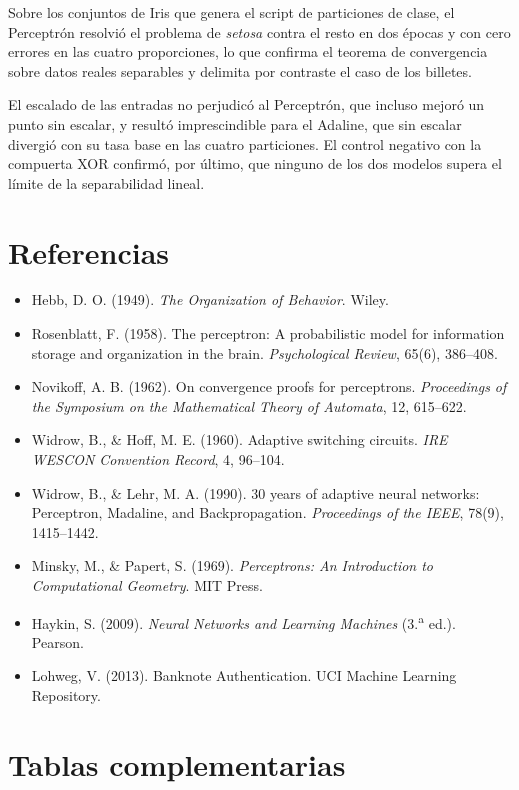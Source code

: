 \documentclass[11pt,letterpaper]{article}
\begin{document}
Sobre los conjuntos de Iris que genera el script de particiones de clase, el Perceptrón resolvió el problema de \textit{setosa} contra el resto en dos épocas y con cero errores en las cuatro proporciones, lo que confirma el teorema de convergencia sobre datos reales separables y delimita por contraste el caso de los billetes.

El escalado de las entradas no perjudicó al Perceptrón, que incluso mejoró un punto sin escalar, y resultó imprescindible para el Adaline, que sin escalar divergió con su tasa base en las cuatro particiones. El control negativo con la compuerta XOR confirmó, por último, que ninguno de los dos modelos supera el límite de la separabilidad lineal.

\section{Referencias}
\begin{itemize}
    \item Hebb, D. O. (1949). \textit{The Organization of Behavior}. Wiley.
    \item Rosenblatt, F. (1958). The perceptron: A probabilistic model for information storage and organization in the brain. \textit{Psychological Review}, 65(6), 386--408.
    \item Novikoff, A. B. (1962). On convergence proofs for perceptrons. \textit{Proceedings of the Symposium on the Mathematical Theory of Automata}, 12, 615--622.
    \item Widrow, B., \& Hoff, M. E. (1960). Adaptive switching circuits. \textit{IRE WESCON Convention Record}, 4, 96--104.
    \item Widrow, B., \& Lehr, M. A. (1990). 30 years of adaptive neural networks: Perceptron, Madaline, and Backpropagation. \textit{Proceedings of the IEEE}, 78(9), 1415--1442.
    \item Minsky, M., \& Papert, S. (1969). \textit{Perceptrons: An Introduction to Computational Geometry}. MIT Press.
    \item Haykin, S. (2009). \textit{Neural Networks and Learning Machines} (3.\textsuperscript{a} ed.). Pearson.
    \item Lohweg, V. (2013). Banknote Authentication. UCI Machine Learning Repository.
\end{itemize}

\appendix
\section{Tablas complementarias}
\end{document}
